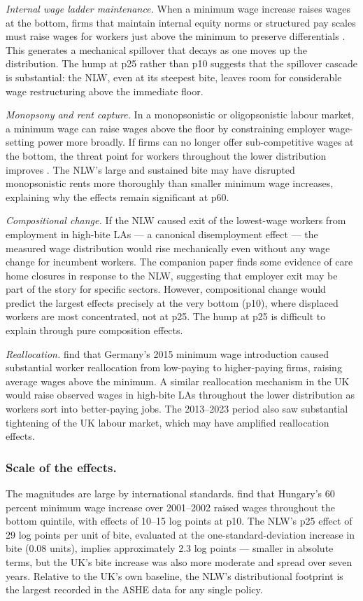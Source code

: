 \documentclass[12pt]{article}
\begin{document}
\textit{Internal wage ladder maintenance.} When a minimum wage increase raises wages at the bottom, firms that maintain internal equity norms or structured pay scales must raise wages for workers just above the minimum to preserve differentials \citep{autor2016contribution, dube2019minimum}. This generates a mechanical spillover that decays as one moves up the distribution. The hump at p25 rather than p10 suggests that the spillover cascade is substantial: the NLW, even at its steepest bite, leaves room for considerable wage restructuring above the immediate floor.

\textit{Monopsony and rent capture.} In a monopsonistic or oligopsonistic labour market, a minimum wage can raise wages above the floor by constraining employer wage-setting power more broadly. If firms can no longer offer sub-competitive wages at the bottom, the threat point for workers throughout the lower distribution improves \citep{manning2021elusive}. The NLW's large and sustained bite may have disrupted monopsonistic rents more thoroughly than smaller minimum wage increases, explaining why the effects remain significant at p60.

\textit{Compositional change.} If the NLW caused exit of the lowest-wage workers from employment in high-bite LAs --- a canonical disemployment effect --- the measured wage distribution would rise mechanically even without any wage change for incumbent workers. The companion paper \citep{apep0515nlw} finds some evidence of care home closures in response to the NLW, suggesting that employer exit may be part of the story for specific sectors. However, compositional change would predict the largest effects precisely at the very bottom (p10), where displaced workers are most concentrated, not at p25. The hump at p25 is difficult to explain through pure composition effects.

\textit{Reallocation.} \citet{dustmann2022reallocation} find that Germany's 2015 minimum wage introduction caused substantial worker reallocation from low-paying to higher-paying firms, raising average wages above the minimum. A similar reallocation mechanism in the UK would raise observed wages in high-bite LAs throughout the lower distribution as workers sort into better-paying jobs. The 2013--2023 period also saw substantial tightening of the UK labour market, which may have amplified reallocation effects.

\subsubsection*{Scale of the effects.}
The magnitudes are large by international standards. \citet{harasztosi2019pays} find that Hungary's 60 percent minimum wage increase over 2001--2002 raised wages throughout the bottom quintile, with effects of 10--15 log points at p10. The NLW's p25 effect of 29 log points per unit of bite, evaluated at the one-standard-deviation increase in bite (0.08 units), implies approximately 2.3 log points --- smaller in absolute terms, but the UK's bite increase was also more moderate and spread over seven years. Relative to the UK's own baseline, the NLW's distributional footprint is the largest recorded in the ASHE data for any single policy.
\end{document}
